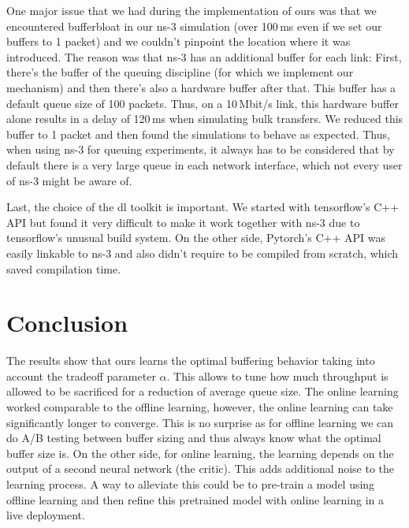 \documentclass[conference]{IEEEtran}
\begin{document}
One major issue that we had during the implementation of \gls{ours} was that we encountered bufferbloat in our ns-3 simulation (over 100\,ms even if we set our buffers to 1 packet) and we couldn't pinpoint the location where it was introduced. The reason was that ns-3 has an additional buffer for each link: First, there's the buffer of the queuing discipline (for which we implement our mechanism) and then there's also a hardware buffer after that. This buffer has a default queue size of 100 packets. Thus, on a 10\,Mbit/s link, this hardware buffer alone results in a delay of 120\,ms when simulating bulk transfers. We reduced this buffer to 1 packet and then found the simulations to behave as expected. Thus, when using ns-3 for queuing experiments, it always has to be considered that by default there is a very large queue in each network interface, which not every user of ns-3 might be aware of. 

Last, the choice of the \gls{dl} toolkit is important. We started with tensorflow's C++ API but found it very difficult to make it work together with ns-3 due to tensorflow's unusual build system. On the other side, Pytorch's C++ API was easily linkable to ns-3 and also didn't require to be compiled from scratch, which saved compilation time. 

\section{Conclusion}

The results show that \gls{ours} learns the optimal buffering behavior taking into account the tradeoff parameter $\alpha$. This allows to tune how much throughput is allowed to be sacrificed for a reduction of average queue size. The online learning worked comparable to the offline learning, however, the online learning can take significantly longer to converge. This is no surprise as for offline learning we can do A/B testing between buffer sizing and thus always know what the optimal buffer size is. On the other side, for online learning, the learning depends on the output of a second neural network (the critic). This adds additional noise to the learning process. A way to alleviate this could be to pre-train a model using offline learning and then refine this pretrained model with online learning in a live deployment. 
\end{document}
